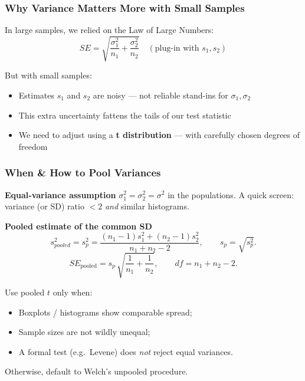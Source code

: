 \documentclass[handout]{beamer}
\begin{document}
\begin{frame}
\frametitle{Why Variance Matters More with Small Samples}

In large samples, we relied on the Law of Large Numbers:\\
\[
SE = \sqrt{\frac{\sigma_1^2}{n_1} + \frac{\sigma_2^2}{n_2}} \quad (\text{plug-in with } s_1, s_2)
\]

\vspace{1em}
\pause

\large
But with small samples:
\begin{itemize}
  \item Estimates \(s_1\) and \(s_2\) are noisy — not reliable stand-ins for \(\sigma_1, \sigma_2\)
  \item This extra uncertainty fattens the tails of our test statistic
  \item We need to adjust using a \textbf{t distribution} — with carefully chosen degrees of freedom
\end{itemize}
\end{frame}


\begin{frame}
\frametitle{When \& How to Pool Variances}

\textbf{Equal‐variance assumption}
\(\sigma_1^2 = \sigma_2^2 = \sigma^2\) in the populations.
A quick screen: variance (or SD) ratio $<2$ \textit{and} similar histograms.

\vspace{0.5em}
\textbf{Pooled estimate of the common SD}
\[
s_{pooled}^2 =
s_p^2
=
\frac{(n_1-1)s_1^{2} + (n_2-1)s_2^{2}}
     {\,n_1+n_2-2\,},
\qquad
s_p = \sqrt{s_p^2}.
\]
\[
SE_{\text{pooled}}
=
s_p\,
\sqrt{\frac{1}{n_1}+\frac{1}{n_2}},
\qquad
df = n_1+n_2-2.
\]

\begin{block}{Use pooled $t$ only when:}
\begin{itemize}
  \item Boxplots / histograms show comparable spread;\\[-0.4em]
  \item Sample sizes are not wildly unequal;\\[-0.4em]
  \item A formal test (e.g.\ Levene) does \emph{not} reject equal variances.
\end{itemize}
\end{block}

\alert{Otherwise, default to Welch’s unpooled procedure.}
\end{frame}
\end{document}
